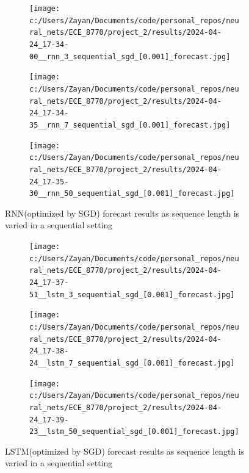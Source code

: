 \documentclass[12pt, letterpaper]{article}
\begin{document}
\begin{figure}[htpb]
    \centering
    \begin{subfigure}[b]{0.3\textwidth}
        \texttt{[image: c:/Users/Zayan/Documents/code/personal\_repos/neural\_nets/ECE\_8770/project\_2/results/2024-04-24\_17-34-00\_\_rnn\_3\_sequential\_sgd\_[0.001]\_forecast.jpg]}
    \end{subfigure}
    \begin{subfigure}[b]{0.3\textwidth}
        \texttt{[image: c:/Users/Zayan/Documents/code/personal\_repos/neural\_nets/ECE\_8770/project\_2/results/2024-04-24\_17-34-35\_\_rnn\_7\_sequential\_sgd\_[0.001]\_forecast.jpg]}
    \end{subfigure}
    \begin{subfigure}[b]{0.3\textwidth}
        \texttt{[image: c:/Users/Zayan/Documents/code/personal\_repos/neural\_nets/ECE\_8770/project\_2/results/2024-04-24\_17-35-30\_\_rnn\_50\_sequential\_sgd\_[0.001]\_forecast.jpg]}
    \end{subfigure}
    \caption{RNN(optimized by SGD) forecast results as sequence length is varied in a sequential setting}
    \label{fig: SGD-RNN forecast results as sequence length is varied in a sequential setting}
\end{figure}

\begin{figure}[htpb]
    \centering
    \begin{subfigure}[b]{0.3\textwidth}
        \texttt{[image: c:/Users/Zayan/Documents/code/personal\_repos/neural\_nets/ECE\_8770/project\_2/results/2024-04-24\_17-37-51\_\_lstm\_3\_sequential\_sgd\_[0.001]\_forecast.jpg]}
    \end{subfigure}
    \begin{subfigure}[b]{0.3\textwidth}
        \texttt{[image: c:/Users/Zayan/Documents/code/personal\_repos/neural\_nets/ECE\_8770/project\_2/results/2024-04-24\_17-38-24\_\_lstm\_7\_sequential\_sgd\_[0.001]\_forecast.jpg]}
    \end{subfigure}
    \begin{subfigure}[b]{0.3\textwidth}
        \texttt{[image: c:/Users/Zayan/Documents/code/personal\_repos/neural\_nets/ECE\_8770/project\_2/results/2024-04-24\_17-39-23\_\_lstm\_50\_sequential\_sgd\_[0.001]\_forecast.jpg]}
    \end{subfigure}
    \caption{LSTM(optimized by SGD) forecast results as sequence length is varied in a sequential setting}
    \label{fig: SGD-LSTM forecast results as sequence length is varied in a sequential setting}
\end{figure}
\end{document}
